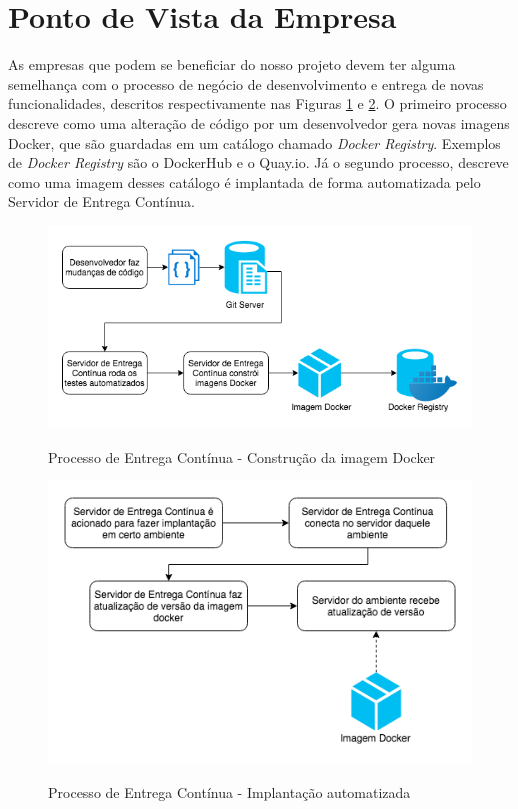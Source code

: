 	\section{Ponto de Vista da Empresa}
	    As empresas que podem se beneficiar do nosso projeto devem ter alguma semelhança com o processo de negócio de desenvolvimento e entrega de novas funcionalidades, descritos respectivamente nas Figuras \ref{fig:build-ci} e \ref{fig:automated-deploy}. O primeiro processo descreve como uma alteração de código por um desenvolvedor gera novas imagens Docker, que são guardadas em um catálogo chamado \textit{Docker Registry}. Exemplos de \textit{Docker Registry} são o DockerHub e o Quay.io. Já o segundo processo, descreve como uma imagem desses catálogo é implantada de forma automatizada pelo Servidor de Entrega Contínua.
	    \begin{figure}[htb]
    	    \centering
    	    \caption{Processo de Entrega Contínua - Construção da imagem Docker}
    	    \includegraphics[scale=0.7]{pictures/especificacao-de-projeto/build-ci.png}
    	    \label{fig:build-ci}
	    \end{figure}
	    \begin{figure}[htb]
    	    \centering
    	    \caption{Processo de Entrega Contínua - Implantação automatizada}
    	    \includegraphics[scale=0.7]{pictures/especificacao-de-projeto/automated-deploy.png}
    	    \label{fig:automated-deploy}
	    \end{figure}

